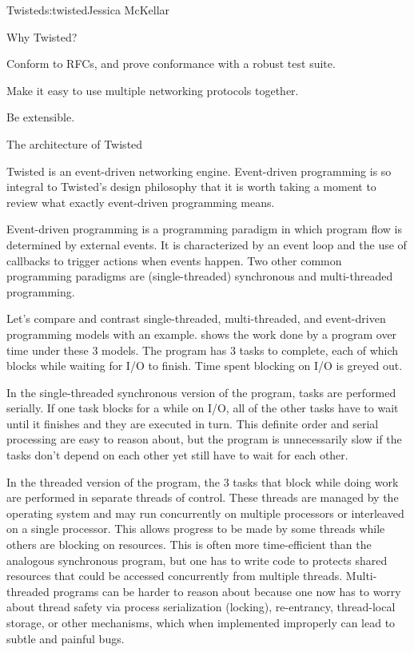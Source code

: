 \begin{aosachapter}{Twisted}{s:twisted}{Jessica McKellar}
\begin{aosasect1}{Why Twisted?}
\begin{aosaitemize}
\item Conform to RFCs, and prove conformance with a robust test suite.

\item Make it easy to use multiple networking protocols together.

\item Be extensible.

\end{aosaitemize}

\end{aosasect1}

\begin{aosasect1}{The architecture of Twisted}

Twisted is an event-driven networking engine. Event-driven programming is so
integral to Twisted's design philosophy that it is worth taking a moment to
review what exactly event-driven programming means.

Event-driven programming is a programming paradigm in which program flow is
determined by external events. It is characterized by an event loop and the use
of callbacks to trigger actions when events happen. Two other common
programming paradigms are (single-threaded) synchronous and multi-threaded
programming.


Let's compare and contrast single-threaded, multi-threaded, and
event-driven programming models with an example.
 shows the work done by a
program over time under these 3 models. The program has 3 tasks to
complete, each of which blocks while waiting for I/O to finish. Time
spent blocking on I/O is greyed out.

In the single-threaded synchronous version of the program, tasks are
performed serially. If one task blocks for a while on I/O, all of the other
tasks have to wait until it finishes and they are executed in turn. This
definite order and serial processing are easy to reason about, but the program
is unnecessarily slow if the tasks don't depend on each other yet still have to
wait for each other.

In the threaded version of the program, the 3 tasks that block while doing
work are performed in separate threads of control. These threads are managed by
the operating system and may run concurrently on multiple processors or
interleaved on a single processor. This allows progress to be made by some
threads while others are blocking on resources. This is often more
time-efficient than the analogous synchronous program, but one has to write code
to protects shared resources that could be accessed concurrently from multiple
threads. Multi-threaded programs can be harder to reason about because one now
has to worry about thread safety via process serialization (locking),
re-entrancy, thread-local storage, or other mechanisms, which when implemented
improperly can lead to subtle and painful bugs.


\end{aosasect1}
\end{aosachapter}
